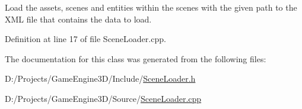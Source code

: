 Load the assets, scenes and entities within the scenes with the given path to the X\+ML file that contains the data to load. 

Definition at line 17 of file Scene\+Loader.\+cpp.



The documentation for this class was generated from the following files\+:\begin{DoxyCompactItemize}
\item 
D\+:/\+Projects/\+Game\+Engine3\+D/\+Include/\mbox{\hyperlink{_scene_loader_8h}{Scene\+Loader.\+h}}\item 
D\+:/\+Projects/\+Game\+Engine3\+D/\+Source/\mbox{\hyperlink{_scene_loader_8cpp}{Scene\+Loader.\+cpp}}\end{DoxyCompactItemize}
